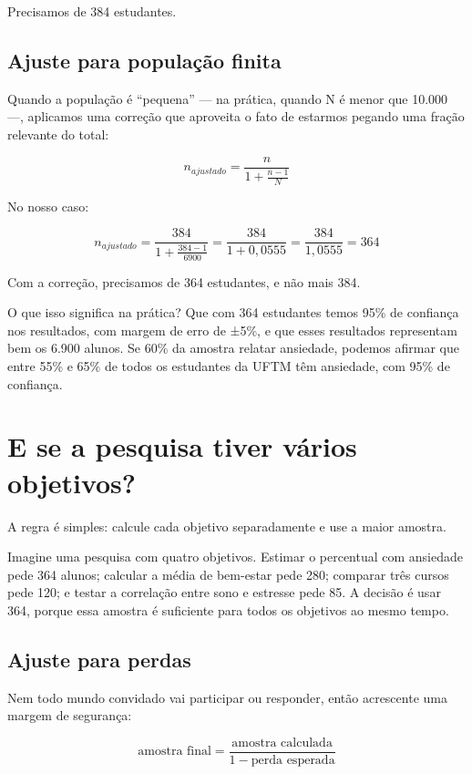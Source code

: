 \documentclass[
]{book}
\begin{document}
Precisamos de 384 estudantes.

\subsection{Ajuste para população finita}\label{ajuste-para-populauxe7uxe3o-finita}

Quando a população é ``pequena'' --- na prática, quando N é menor que 10.000 ---, aplicamos uma correção que aproveita o fato de estarmos pegando uma fração relevante do total:

\[
n_{ajustado} = \frac{n}{1 + \frac{n-1}{N}}
\]

No nosso caso:

\[
n_{ajustado} = \frac{384}{1 + \frac{384-1}{6900}} = \frac{384}{1 + 0,0555} = \frac{384}{1,0555} = 364
\]

Com a correção, precisamos de 364 estudantes, e não mais 384.

O que isso significa na prática? Que com 364 estudantes temos 95\% de confiança nos resultados, com margem de erro de ±5\%, e que esses resultados representam bem os 6.900 alunos. Se 60\% da amostra relatar ansiedade, podemos afirmar que entre 55\% e 65\% de todos os estudantes da UFTM têm ansiedade, com 95\% de confiança.

\section{E se a pesquisa tiver vários objetivos?}\label{e-se-a-pesquisa-tiver-vuxe1rios-objetivos}

A regra é simples: calcule cada objetivo separadamente e use a maior amostra.

Imagine uma pesquisa com quatro objetivos. Estimar o percentual com ansiedade pede 364 alunos; calcular a média de bem-estar pede 280; comparar três cursos pede 120; e testar a correlação entre sono e estresse pede 85. A decisão é usar 364, porque essa amostra é suficiente para todos os objetivos ao mesmo tempo.

\subsection{Ajuste para perdas}\label{ajuste-para-perdas}

Nem todo mundo convidado vai participar ou responder, então acrescente uma margem de segurança:

\[
\text{amostra final} = \frac{\text{amostra calculada}}{1 - \text{perda esperada}}
\]
\end{document}
